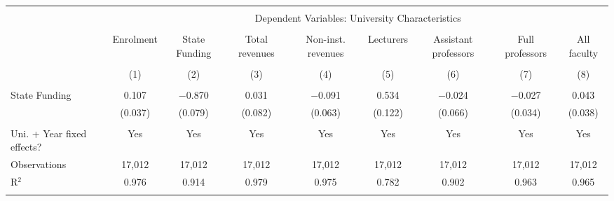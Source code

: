 
\begin{tabular}{@{\extracolsep{5pt}}lcccccccc} 
\\[-1.8ex]\hline 
\hline \\[-1.8ex] 
 & \multicolumn{8}{c}{Dependent Variables: University Characteristics} \\ 
\cline{2-9} 
\\[-1.8ex] & Enrolment & State Funding & Total revenues & Non-inst. revenues & Lecturers & Assistant professors & Full professors & All faculty \\ 
\\[-1.8ex] & (1) & (2) & (3) & (4) & (5) & (6) & (7) & (8)\\ 
\hline \\[-1.8ex] 
 State Funding & 0.107 & $-$0.870 & 0.031 & $-$0.091 & 0.534 & $-$0.024 & $-$0.027 & 0.043 \\ 
  & (0.037) & (0.079) & (0.082) & (0.063) & (0.122) & (0.066) & (0.034) & (0.038) \\ 
 \hline \\[-1.8ex] 
Uni. + Year fixed effects? & Yes & Yes & Yes & Yes & Yes & Yes & Yes & Yes \\ 
Observations & 17,012 & 17,012 & 17,012 & 17,012 & 17,012 & 17,012 & 17,012 & 17,012 \\ 
R$^{2}$ & 0.976 & 0.914 & 0.979 & 0.975 & 0.782 & 0.902 & 0.963 & 0.965 \\ 
\hline 
\hline \\[-1.8ex] 
\end{tabular} 
